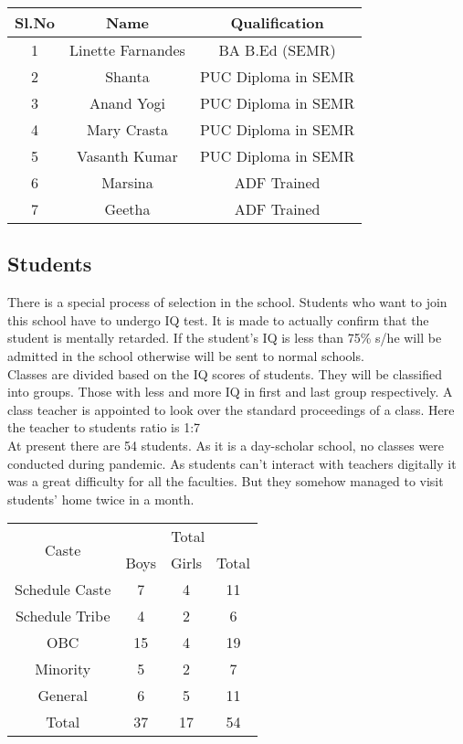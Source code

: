 \begin{table}[H]
    \centering
    \begin{tabular}{c|c|c}\toprule \midrule 
        Sl.No & Name & Qualification  \\ \toprule \midrule 
        1 & Linette Farnandes & BA B.Ed (SEMR) \\ \hline
        2 & Shanta & PUC Diploma in SEMR \\ \hline 
        3 & Anand Yogi & PUC Diploma in SEMR \\ \hline 
        4 & Mary Crasta & PUC Diploma in SEMR \\ \hline 
        5 & Vasanth Kumar & PUC Diploma in SEMR \\ \hline   
        6 & Marsina & ADF Trained \\ \hline 
        7 & Geetha & ADF Trained \\ \toprule \midrule 
        \end{tabular}
\end{table}

\subsection{Students}
There is a special process of selection in the school. Students who want to join this school have to undergo IQ test. It is made to actually confirm that the student is mentally retarded. If the student's IQ is less than 75\% s/he will be admitted in the school otherwise will be sent to normal schools. \\

\noindent Classes are divided based on the IQ scores of students. They will be classified into groups. Those with less and more IQ in first and last group respectively. A class teacher is appointed to look over the standard proceedings of a class. Here the teacher to students ratio is 1:7\\

At present there are 54 students. As it is a day-scholar school, no classes were conducted during pandemic. As students can't interact with teachers digitally it was a great difficulty for all the faculties. But they somehow managed to visit students' home twice in a month.

\begin{table}[H]
    \centering
    \begin{tabular}{c|c|c|c} \toprule \bottomrule 
        \multirow{2}{*}{Caste} & \multicolumn{3}{c}{Total} \\ \cline{2-4}
        & Boys & Girls & Total \\ \hline
        Schedule Caste & 7 & 4 & 11  \\ \hline
        Schedule Tribe & 4 & 2 & 6 \\ \hline 
        OBC & 15 & 4 & 19 \\ \hline 
        Minority & 5 & 2 & 7 \\ \hline 
        General & 6 & 5 & 11 \\ \toprule \bottomrule 
        Total & 37 & 17 & 54 \\ \toprule \bottomrule
    \end{tabular}
\end{table}

